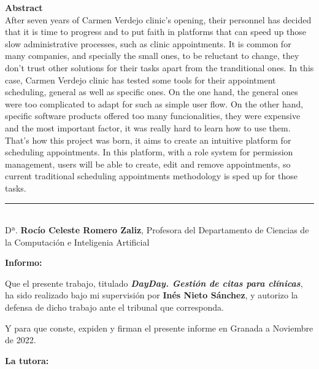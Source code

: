 \noindent\textbf{Abstract}\\
After seven years of Carmen Verdejo clinic's opening, their personnel has decided that it is time to progress and to put faith in platforms that can speed up those slow administrative processes, such as clinic appointments. It is common for many companies, and specially the small ones, to be reluctant to change, they don't trust other solutions for their tasks apart from the tranditional ones. In this case, Carmen Verdejo clinic has tested some tools for their appointment scheduling, general as well as specific ones. On the one hand, the general ones were too complicated to adapt for such as simple user flow. On the other hand, specific software products offered too many funcionalities, they were expensive and the most important factor, it was really hard to learn how to use them. That's how this project was born, it aims to create an intuitive platform for scheduling appointments. In this platform, with a role system for permission management, users will be able to create, edit and remove appointments, so current traditional scheduling appointments methodology is sped up for those tasks.

\cleardoublepage

\thispagestyle{empty}

\noindent\rule[-1ex]{\textwidth}{2pt}\\[4.5ex]

Dª. \textbf{Rocío Celeste Romero Zaliz}, Profesora del Departamento de Ciencias de la Computación e Inteligenia Artificial

\vspace{0.5cm}

\textbf{Informo:}

\vspace{0.5cm}

Que el presente trabajo, titulado \textit{\textbf{DayDay. Gestión de citas para clínicas}},
ha sido realizado bajo mi supervisión por \textbf{Inés Nieto Sánchez}, y autorizo la defensa de dicho trabajo ante el tribunal
que corresponda.

\vspace{0.5cm}

Y para que conste, expiden y firman el presente informe en Granada a Noviembre de 2022.

\vspace{1cm}

\textbf{La tutora: }

\vspace{5cm}

